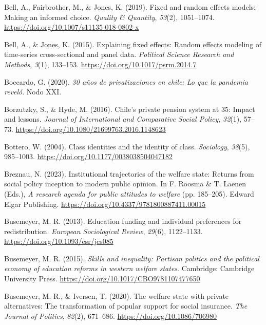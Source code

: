 \documentclass[
  12pt,
]{article}
\newlength{\cslhangindent}
\newenvironment{CSLReferences}[2] %
 {\begin{list}{}{%
  \setlength{\itemindent}{0pt}
  \setlength{\leftmargin}{0pt}
  \setlength{\parsep}{0pt}
  \ifodd #1
   \setlength{\leftmargin}{\cslhangindent}
   \setlength{\itemindent}{-1\cslhangindent}
  \fi
  \setlength{\itemsep}{#2\baselineskip}}}
 {\end{list}}
\begin{document}
\begin{CSLReferences}{1}{0}
Bell, A., Fairbrother, M., \& Jones, K. (2019). Fixed and random effects
models: Making an informed choice. \emph{Quality \& Quantity},
\emph{53}(2), 1051--1074.
\url{https://doi.org/10.1007/s11135-018-0802-x}

Bell, A., \& Jones, K. (2015). Explaining fixed effects: Random effects
modeling of time-series cross-sectional and panel data. \emph{Political
Science Research and Methods}, \emph{3}(1), 133--153.
\url{https://doi.org/10.1017/psrm.2014.7}

Boccardo, G. (2020). \emph{30 años de privatizaciones en chile: Lo que
la pandemia reveló}. Nodo XXI.

Borzutzky, S., \& Hyde, M. (2016). Chile's private pension system at 35:
Impact and lessons. \emph{Journal of International and Comparative
Social Policy}, \emph{32}(1), 57--73.
\url{https://doi.org/10.1080/21699763.2016.1148623}

Bottero, W. (2004). Class identities and the identity of class.
\emph{Sociology}, \emph{38}(5), 985--1003.
\url{https://doi.org/10.1177/0038038504047182}

Breznau, N. (2023). Institutional trajectories of the welfare state:
Returns from social policy inception to modern public opinion. In F.
Roosma \& T. Laenen (Eds.), \emph{A research agenda for public attitudes
to welfare} (pp. 185--205). Edward Elgar Publishing.
\url{https://doi.org/10.4337/9781800887411.00015}

Busemeyer, M. R. (2013). Education funding and individual preferences
for redistribution. \emph{European Sociological Review}, \emph{29}(6),
1122--1133. \url{https://doi.org/10.1093/esr/jcs085}

Busemeyer, M. R. (2015). \emph{Skills and inequality: Partisan politics
and the political economy of education reforms in western welfare
states}. Cambridge: Cambridge University Press.
\url{https://doi.org/10.1017/CBO9781107477650}

Busemeyer, M. R., \& Iversen, T. (2020). The welfare state with private
alternatives: The transformation of popular support for social
insurance. \emph{The Journal of Politics}, \emph{82}(2), 671--686.
\url{https://doi.org/10.1086/706980}


\end{CSLReferences}
\end{document}
